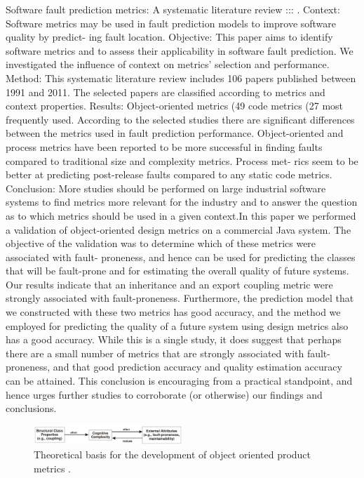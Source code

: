 Software fault prediction metrics: A systematic literature review ::: \cite{b7radjenovic2013software}. Context: Software metrics may be used in fault prediction models to improve software quality by predict-
ing fault location.
Objective: This paper aims to identify software metrics and to assess their applicability in software fault
prediction. We investigated the influence of context on metrics’ selection and performance.
Method: This systematic literature review includes 106 papers published between 1991 and 2011. The
selected papers are classified according to metrics and context properties.
Results: Object-oriented metrics (49%
code metrics (27%
most frequently used. According to the selected studies there are significant differences between the
metrics used in fault prediction performance. Object-oriented and process metrics have been reported
to be more successful in finding faults compared to traditional size and complexity metrics. Process met-
rics seem to be better at predicting post-release faults compared to any static code metrics.
Conclusion: More studies should be performed on large industrial software systems to find metrics more
relevant for the industry and to answer the question as to which metrics should be used in a given
context.In this paper we performed a validation of object-oriented design metrics on a commercial Java system.
The objective of the validation was to determine which of these metrics were associated with fault-
proneness, and hence can be used for predicting the classes that will be fault-prone and for estimating
the overall quality of future systems. Our results indicate that an inheritance and an export coupling
metric were strongly associated with fault-proneness. Furthermore, the prediction model that we
constructed with these two metrics has good accuracy, and the method we employed for predicting the
quality of a future system using design metrics also has a good accuracy.
While this is a single study, it does suggest that perhaps there are a small number of metrics that are
strongly associated with fault-proneness, and that good prediction accuracy and quality estimation
accuracy can be attained. This conclusion is encouraging from a practical standpoint, and hence urges
further studies to corroborate (or otherwise) our findings and conclusions.

\begin{figure}[htbp]
	\centerline{\includegraphics[width=0.5\textwidth]{pictures/faultyclasses1.png}}
	\caption{Theoretical basis for the development of object oriented product metrics \cite{b7radjenovic2013software}.}
	\label{fig3}
\end{figure}

